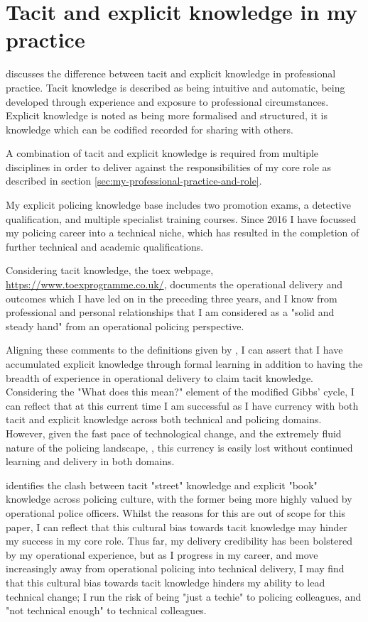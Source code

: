 \documentclass[12pt,a4paper,oneside]{report}
\begin{document}
\section{Tacit and explicit knowledge in my practice} 
\label{sec:tacit-and-explicit-knowledge-in-my-practice}
\citet{smith2001role} discusses the difference between tacit and explicit knowledge in professional practice.  Tacit knowledge is described as being intuitive and automatic, being developed through experience and exposure to professional circumstances.  Explicit knowledge is noted as being more formalised and structured, it is knowledge which can be codified recorded for sharing with others.

A combination of tacit and explicit knowledge is required from multiple disciplines in order to deliver against the responsibilities of my core role as described in section \ref{sec:my-professional-practice-and-role}.  

My explicit policing knowledge base includes two promotion exams, a detective qualification, and multiple specialist training courses.  Since 2016 I have focussed my policing career into a technical niche, which has resulted in the completion of further technical and academic qualifications. 

Considering tacit knowledge, the \gls{toex} webpage, \url{https://www.toexprogramme.co.uk/}, documents the operational delivery and outcomes which I have led on in the preceding three years, and I know from professional and personal relationships that I am considered as a "solid and steady hand" from an operational policing perspective.

Aligning these comments to the definitions given by \citet{smith2001role}, I can assert that I have accumulated explicit knowledge through formal learning in addition to having the breadth of experience in operational delivery to claim tacit knowledge.  Considering the "What does this mean?" element of the modified Gibbs' cycle, I can reflect that at this current time I am successful as I have currency with both tacit and explicit knowledge across both technical and policing domains.  However, given the fast pace of technological change, and the extremely fluid nature of the policing landscape, \citep{homeoffice2024reform}, this currency is easily lost without continued learning and delivery in both domains.

\citet{gundhus2013experience} identifies the clash between tacit "street" knowledge and  explicit "book" knowledge across policing culture, with the former being more highly valued by operational police officers.  Whilst the reasons for this are out of scope for this paper, I can reflect that this cultural bias towards tacit knowledge may hinder my success in my core role.  Thus far, my delivery credibility has been bolstered by my operational experience, but as I progress in my career, and move increasingly away from operational policing into technical delivery, I may find that this cultural bias towards tacit knowledge hinders my ability to lead technical change; I run the risk of being "just a techie" to policing colleagues, and "not technical enough" to technical colleagues.
\end{document}
